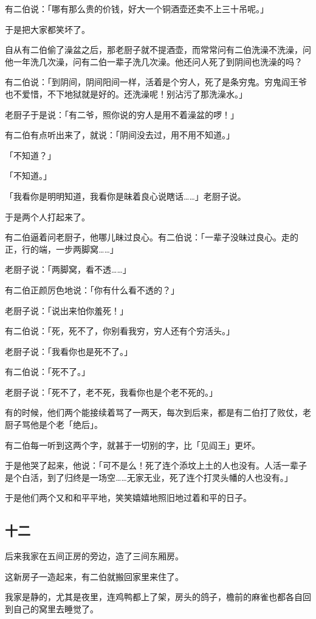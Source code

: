 \documentclass[UTF8]{ctexart}
\begin{document}
有二伯说：「哪有那么贵的价钱，好大一个铜酒壶还卖不上三十吊呢。」

于是把大家都笑坏了。

自从有二伯偷了澡盆之后，那老厨子就不提酒壶，而常常问有二伯洗澡不洗澡，问他一年洗几次澡，问有二伯一辈子洗几次澡。他还问人死了到阴间也洗澡的吗？

有二伯说：「到阴间，阴间阳间一样，活着是个穷人，死了是条穷鬼。穷鬼阎王爷也不爱惜，不下地狱就是好的。还洗澡呢！别沾污了那洗澡水。」

老厨子于是说：「有二爷，照你说的穷人是用不着澡盆的啰！」

有二伯有点听出来了，就说：「阴间没去过，用不用不知道。」

「不知道？」

「不知道。」

「我看你是明明知道，我看你是昧着良心说瞎话……」老厨子说。

于是两个人打起来了。

有二伯逼着问老厨子，他哪儿昧过良心。有二伯说：「一辈子没昧过良心。走的正，行的端，一步两脚窝……」

老厨子说：「两脚窝，看不透……」

有二伯正颜厉色地说：「你有什么看不透的？」

老厨子说：「说出来怕你羞死！」

有二伯说：「死，死不了，你别看我穷，穷人还有个穷活头。」

老厨子说：「我看你也是死不了。」

有二伯说：「死不了。」

老厨子说：「死不了，老不死，我看你也是个老不死的。」

有的时候，他们两个能接续着骂了一两天，每次到后来，都是有二伯打了败仗，老厨子骂他是个老「绝后」。

有二伯每一听到这两个字，就甚于一切别的字，比「见阎王」更坏。

于是他哭了起来，他说：「可不是么！死了连个添坟上土的人也没有。{人活一辈子是个白活，到了归终是一场空……无家无业，死了连个打灵头幡的人也没有。}」

于是他们两个又和和平平地，笑笑嬉嬉地照旧地过着和平的日子。

\subsection{十二}

后来我家在五间正房的旁边，造了三间东厢房。

这新房子一造起来，有二伯就搬回家里来住了。

我家是静的，尤其是夜里，连鸡鸭都上了架，房头的鸽子，檐前的麻雀也都各自回到自己的窝里去睡觉了。
\end{document}
